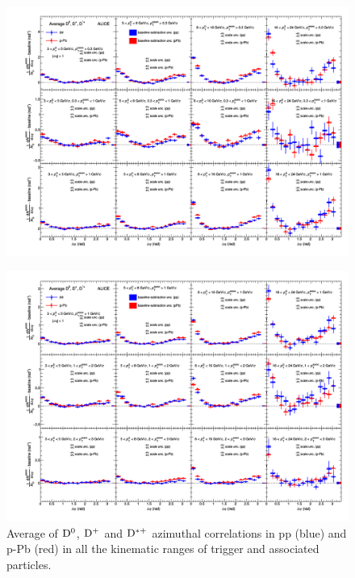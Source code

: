 \begin{figure}
\centering
\includegraphics[width=1.3\textwidth,angle=270]{figures/CfrPPandModels/plotComparison_WeightedAverage_pp_pPb_UniqueCanvas_Style1_1.png}
\end{figure}
\begin{figure}
\centering
\includegraphics[width=1.3\textwidth,angle=270]{figures/CfrPPandModels/plotComparison_WeightedAverage_pp_pPb_UniqueCanvas_Style1_2.png}
\caption{Average of ${\rm D^0}$, ${\rm D^+}$ and ${\rm D^{*+}}$ azimuthal correlations in pp (blue) and p-Pb (red) in all the kinematic ranges of trigger and associated particles.}
\label{fig:pp-pPb}
\end{figure}

